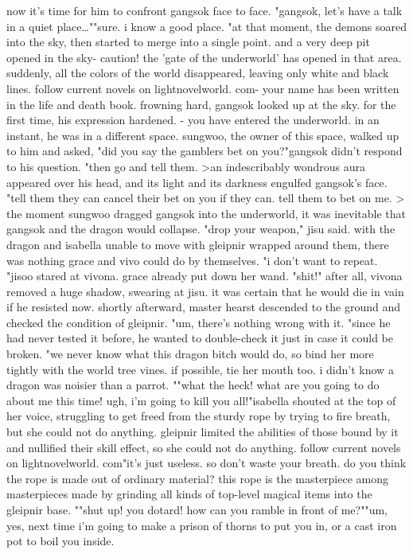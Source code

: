 now it's time for him to confront gangsok face to face.
"gangsok, let's have a talk in a quiet place…""sure.
 i know a good place.
"at that moment, the demons soared into the sky, then started to merge into a single point.
 and a very deep pit opened in the sky- caution! the 'gate of the underworld' has opened in that area.
suddenly, all the colors of the world disappeared, leaving only white and black lines.
follow current novels on lightnovelworld.
com- your name has been written in the life and death book.
frowning hard, gangsok looked up at the sky.
 for the first time, his expression hardened.
- you have entered the underworld.
in an instant, he was in a different space.
sungwoo, the owner of this space, walked up to him and asked, "did you say the gamblers bet on you?"gangsok didn't respond to his question.
 "then go and tell them.
>an indescribably wondrous aura appeared over his head, and its light and its darkness engulfed gangsok's face.
"tell them they can cancel their bet on you if they can.
 tell them to bet on me.
>
the moment sungwoo dragged gangsok into the underworld, it was inevitable that gangsok and the dragon would collapse.
 "drop your weapon," jisu said.
 with the dragon and isabella unable to move with gleipnir wrapped around them, there was nothing grace and vivo could do by themselves.
 "i don't want to repeat.
"jisoo stared at vivona.
 grace already put down her wand.
"shit!" after all, vivona removed a huge shadow, swearing at jisu.
 it was certain that he would die in vain if he resisted now.
 shortly afterward, master hearst descended to the ground and checked the condition of gleipnir.
"um, there's nothing wrong with it.
"since he had never tested it before, he wanted to double-check it just in case it could be broken.
 "we never know what this dragon bitch would do, so bind her more tightly with the world tree vines.
 if possible, tie her mouth too.
 i didn't know a dragon was noisier than a parrot.
""what the heck! what are you going to do about me this time! ugh, i'm going to kill you all!"isabella shouted at the top of her voice, struggling to get freed from the sturdy rope by trying to fire breath, but she could not do anything.
gleipnir limited the abilities of those bound by it and nullified their skill effect, so she could not do anything.
follow current novels on lightnov‌elworld.
com"it's just useless.
 so don't waste your breath.
 do you think the rope is made out of ordinary material? this rope is the masterpiece among masterpieces made by grinding all kinds of top-level magical items into the gleipnir base.
""shut up! you dotard! how can you ramble in front of me?""um, yes, next time i'm going to make a prison of thorns to put you in, or a cast iron pot to boil you inside.
